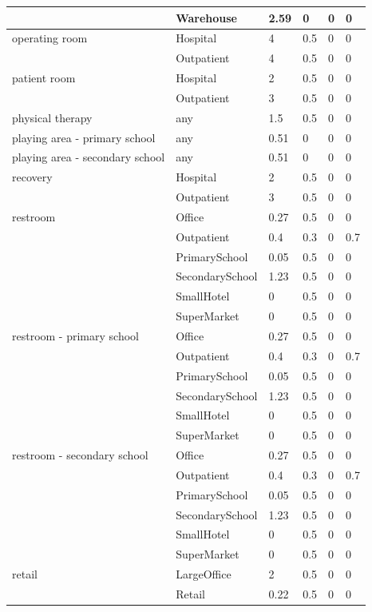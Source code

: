 \begin{center}
\begin{longtable}{|p{2.2in}|p{1.3in}|p{0.7in}|p{0.6in}|p{0.6in}|p{0.6in}|}
 & Warehouse & 2.59 & 0 & 0 & 0 \\ \hline
operating room & Hospital & 4 & 0.5 & 0 & 0 \\ \hline
 & Outpatient & 4 & 0.5 & 0 & 0 \\ \hline
patient room & Hospital & 2 & 0.5 & 0 & 0 \\ \hline
 & Outpatient & 3 & 0.5 & 0 & 0 \\ \hline
physical therapy & any & 1.5 & 0.5 & 0 & 0 \\ \hline
playing area - primary school & any & 0.51 & 0 & 0 & 0 \\ \hline
playing area - secondary school & any & 0.51 & 0 & 0 & 0 \\ \hline
recovery & Hospital & 2 & 0.5 & 0 & 0 \\ \hline
 & Outpatient & 3 & 0.5 & 0 & 0 \\ \hline
restroom & Office & 0.27 & 0.5 & 0 & 0 \\ \hline
 & Outpatient & 0.4 & 0.3 & 0 & 0.7 \\ \hline
 & PrimarySchool & 0.05 & 0.5 & 0 & 0 \\ \hline
 & SecondarySchool & 1.23 & 0.5 & 0 & 0 \\ \hline
 & SmallHotel & 0 & 0.5 & 0 & 0 \\ \hline
 & SuperMarket & 0 & 0.5 & 0 & 0 \\ \hline
restroom - primary school & Office & 0.27 & 0.5 & 0 & 0 \\ \hline
 & Outpatient & 0.4 & 0.3 & 0 & 0.7 \\ \hline
 & PrimarySchool & 0.05 & 0.5 & 0 & 0 \\ \hline
 & SecondarySchool & 1.23 & 0.5 & 0 & 0 \\ \hline
 & SmallHotel & 0 & 0.5 & 0 & 0 \\ \hline
 & SuperMarket & 0 & 0.5 & 0 & 0 \\ \hline
restroom - secondary school & Office & 0.27 & 0.5 & 0 & 0 \\ \hline
 & Outpatient & 0.4 & 0.3 & 0 & 0.7 \\ \hline
 & PrimarySchool & 0.05 & 0.5 & 0 & 0 \\ \hline
 & SecondarySchool & 1.23 & 0.5 & 0 & 0 \\ \hline
 & SmallHotel & 0 & 0.5 & 0 & 0 \\ \hline
 & SuperMarket & 0 & 0.5 & 0 & 0 \\ \hline
retail & LargeOffice & 2 & 0.5 & 0 & 0 \\ \hline
 & Retail & 0.22 & 0.5 & 0 & 0 \\ \hline

\end{longtable}
\end{center}

